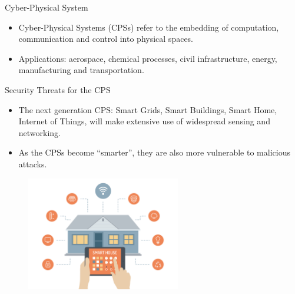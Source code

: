 \documentclass[10pt]{beamer}
\begin{document}
\begin{frame}{Cyber-Physical System}
  \begin{itemize}
  \item Cyber-Physical Systems (CPSs) refer to the embedding of computation, communication and control into physical spaces.
    \begin{center}
    \end{center}
  \item Applications: aerospace, chemical processes, civil infrastructure, energy, manufacturing and transportation. 
  \end{itemize}
\end{frame}

\begin{frame}{Security Threats for the CPS}
  \begin{itemize}
  \item The next generation CPS: Smart Grids, Smart Buildings, Smart Home, Internet of Things, will make extensive use of widespread sensing and networking.
  \item As the CPSs become ``smarter'', they are also more vulnerable to malicious attacks.
  \end{itemize}
  \begin{figure}[ht]
    \centering
    \includegraphics[width=0.6\textwidth]{SmartHome.jpg}
  \end{figure}
\end{frame}
\end{document}
